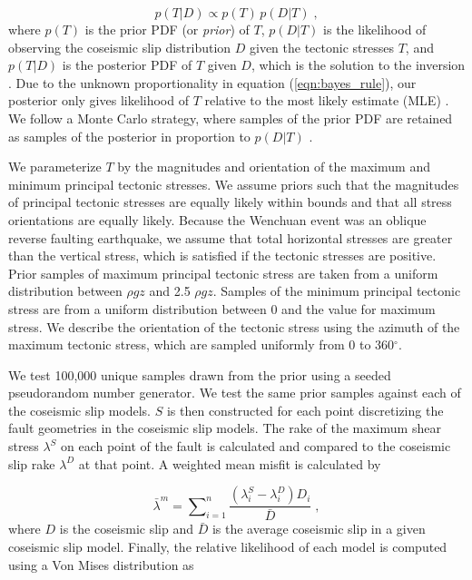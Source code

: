 \documentclass[draft,jgrga]{AGUTeX}
\begin{document}
\begin{article}
\begin{equation} 
p(T|D) \propto p(T) \, p(D|T) \; , 
\label{eqn:bayes_rule} 
\end{equation}
where $p(T)$ is the prior PDF (or \emph{prior}) of $T$, $p(D|T)$ is the
likelihood of observing the coseismic slip distribution $D$ given the
tectonic stresses $T$, and $p(T|D)$ is the posterior PDF of $T$ given
$D$, which is the solution to the inversion \citep[e.g.,][]{mosegaard1995}.
Due to the unknown proportionality in equation (\ref{eqn:bayes_rule}),
our posterior only gives likelihood of $T$ relative to the most likely
estimate (MLE) \citep{tarantola2005}. We follow a Monte Carlo strategy,
where samples of the prior PDF are retained as samples of the posterior
in proportion to $p(D|T)$ \citep[e.g.,][]{mosegaard1995}.

We parameterize $T$ by the magnitudes and orientation of the maximum and
minimum principal tectonic stresses. We assume priors such that the
magnitudes of principal tectonic stresses are equally likely within
bounds and that all stress orientations are equally likely. Because the
Wenchuan event was an oblique reverse faulting earthquake, we assume
that total horizontal stresses are greater than the vertical stress,
which is satisfied if the tectonic stresses are positive. Prior samples
of maximum principal tectonic stress are taken from a uniform distribution
between $\rho g z$ and 2.5 $\rho g z$. Samples of the minimum principal
tectonic stress are from a uniform distribution between 0 and the value for
maximum stress. We describe the orientation of the tectonic stress using
the azimuth of the maximum tectonic stress, which are sampled uniformly
from 0 to 360$^{\circ}$.

We test 100,000 unique samples drawn from the prior using a seeded
pseudorandom number generator. We test the same prior samples against
each of the coseismic slip models. $S$ is then constructed for each
point discretizing the fault geometries in the coseismic slip models.
The rake of the maximum shear stress $\lambda^S$ on each point of the
fault is calculated and compared to the coseismic slip rake $\lambda^D$
at that point. A weighted mean misfit is calculated by

\begin{equation}
\bar{\lambda}^m = \sum \nolimits_{i=1}^n \frac{(\lambda^S_i - \lambda^D_i) D_i} 
{\bar{ D}} \; ,
\label{eqn:rake_misfit}
\end{equation}
where $D$ is the coseismic slip and $\bar{D}$ is the average coseismic
slip in a given coseismic slip model. Finally, the relative likelihood
of each model is computed using a Von Mises distribution as


\end{article}
\end{document}
